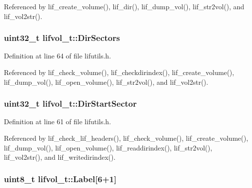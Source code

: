 Referenced by lif\+\_\+create\+\_\+volume(), lif\+\_\+dir(), lif\+\_\+dump\+\_\+vol(), lif\+\_\+str2vol(), and lif\+\_\+vol2str().

\subsubsection[{\texorpdfstring{Dir\+Sectors}{DirSectors}}]{\setlength{\rightskip}{0pt plus 5cm}uint32\+\_\+t lifvol\+\_\+t\+::\+Dir\+Sectors}\hypertarget{structlifvol__t_aceac3bc67cda1f79d91c002411e33897}{}\label{structlifvol__t_aceac3bc67cda1f79d91c002411e33897}


Definition at line 64 of file lifutils.\+h.



Referenced by lif\+\_\+check\+\_\+volume(), lif\+\_\+checkdirindex(), lif\+\_\+create\+\_\+volume(), lif\+\_\+dump\+\_\+vol(), lif\+\_\+open\+\_\+volume(), lif\+\_\+str2vol(), and lif\+\_\+vol2str().

\subsubsection[{\texorpdfstring{Dir\+Start\+Sector}{DirStartSector}}]{\setlength{\rightskip}{0pt plus 5cm}uint32\+\_\+t lifvol\+\_\+t\+::\+Dir\+Start\+Sector}\hypertarget{structlifvol__t_a89b86c990a7843cfa2addfff9a775137}{}\label{structlifvol__t_a89b86c990a7843cfa2addfff9a775137}


Definition at line 61 of file lifutils.\+h.



Referenced by lif\+\_\+check\+\_\+lif\+\_\+headers(), lif\+\_\+check\+\_\+volume(), lif\+\_\+create\+\_\+volume(), lif\+\_\+dump\+\_\+vol(), lif\+\_\+open\+\_\+volume(), lif\+\_\+readdirindex(), lif\+\_\+str2vol(), lif\+\_\+vol2str(), and lif\+\_\+writedirindex().

\subsubsection[{\texorpdfstring{Label}{Label}}]{\setlength{\rightskip}{0pt plus 5cm}uint8\+\_\+t lifvol\+\_\+t\+::\+Label\mbox{[}6+1\mbox{]}}\hypertarget{structlifvol__t_abbccb2f637812a31d24aa1f6725194be}{}\label{structlifvol__t_abbccb2f637812a31d24aa1f6725194be}



